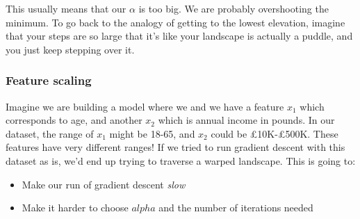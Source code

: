 \documentclass[11pt]{article}
\begin{document}
    This usually means that our $\alpha$ is too big. We are probably overshooting the minimum. To go back to the analogy of getting to the lowest elevation, imagine that your steps are so large that it's like your landscape is actually a puddle, and you just keep stepping over it. 

    \subsubsection{Feature scaling}

    Imagine we are building a model where we and we have a feature $x_1$ which corresponds to age, and another $x_2$ which is annual income in pounds. In our dataset, the range of $x_1$ might be 18-65, and $x_2$ could be £10K-£500K. These features have very different ranges! If we tried to run gradient descent with this dataset as is, we'd end up trying to traverse a warped landscape. This is going to:
    \begin{itemize}
	\item Make our run of gradient descent \textit{slow}
	\item Make it harder to choose $alpha$ and the number of iterations needed
\end{itemize}
 
\end{document}
